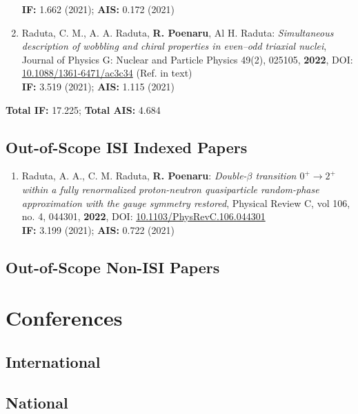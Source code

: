 \begin{enumerate}
    \textbf{IF:} 1.662 (2021); \textbf{AIS:} 0.172 (2021)
    \item Raduta, C. M., A. A. Raduta, \textbf{R. Poenaru}, Al H. Raduta: \emph{Simultaneous description of wobbling and chiral properties in even–odd triaxial nuclei}, Journal of Physics G: Nuclear and Particle Physics 49(2), 025105, \textbf{2022}, DOI: \href{https://iopscience.iop.org/article/10.1088/1361-6471/ac3c34/meta}{10.1088/1361-6471/ac3c34} (Ref. \cite{raduta2022simultaneous} in text) \\
    \textbf{IF:} 3.519 (2021); \textbf{AIS:} 1.115 (2021)
\end{enumerate}

\textbf{Total IF:} 17.225; \textbf{Total AIS:} 4.684 

\subsection{Out-of-Scope ISI Indexed Papers}

\begin{enumerate}
    \item Raduta, A. A., C. M. Raduta, \textbf{R. Poenaru}: \emph{Double-$\beta$ transition $0^+\to2^+$ within a fully renormalized proton-neutron quasiparticle random-phase approximation with the gauge symmetry restored}, Physical Review C, vol 106, no. 4, 044301, \textbf{2022}, DOI: \href{https://journals.aps.org/prc/abstract/10.1103/PhysRevC.106.044301}{10.1103/PhysRevC.106.044301} \\
    \textbf{IF:} 3.199 (2021); \textbf{AIS:} 0.722 (2021)
\end{enumerate}

\subsection{Out-of-Scope Non-ISI Papers}

\section{Conferences}

\subsection{International}

\subsection{National}